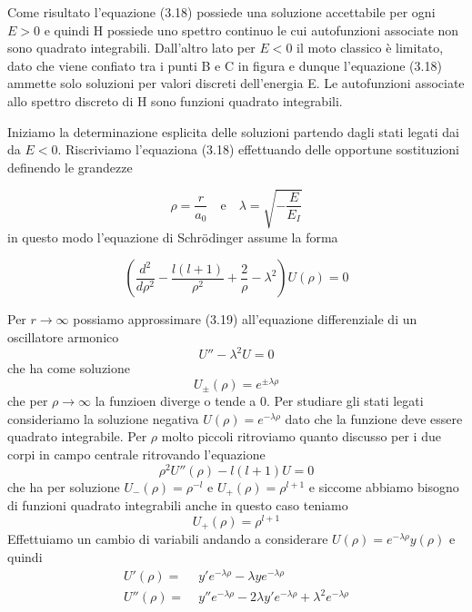 Come risultato l'equazione (3.18) possiede una soluzione accettabile per ogni $E > 0 $ e quindi H possiede uno spettro continuo le cui autofunzioni associate non sono quadrato integrabili. Dall'altro lato per $E < 0 $ il moto classico \`e limitato, dato che viene confiato tra i punti B e C in figura e dunque l'equazione (3.18) ammette solo soluzioni per valori discreti dell'energia E. Le autofunzioni associate allo spettro discreto di H sono funzioni quadrato integrabili.


Iniziamo la determinazione esplicita delle soluzioni partendo dagli stati legati dai da $E < 0$. Riscriviamo l'equaziona (3.18) effettuando delle opportune sostituzioni definendo le grandezze 

\begin{equation*}
	\rho = \frac{r}{a_0} \quad \text{e} \quad \lambda = \sqrt{-\frac{E}{E_I}}
\end{equation*}
in questo modo l'equazione di Schr\"odinger assume la forma 

\begin{equation}
	\left ( \frac{d^2}{d\rho^2} - \frac{l(l+1)}{\rho^2}+\frac{2}{\rho} - \lambda^2 \right )U(\rho) = 0 
\end{equation}

Per $r \to \infty$ possiamo approssimare (3.19) all'equazione differenziale di un oscillatore armonico
\begin{equation*}
	U''-\lambda^2U = 0
\end{equation*} 
che ha come soluzione 
\begin{equation*}
	U_{\pm}(\rho) = e ^{\pm \lambda \rho}
\end{equation*}
che per $\rho \to \infty$ la funzioen diverge o tende a 0. Per studiare gli stati legati consideriamo la soluzione negativa $U(\rho) = e^{-\lambda\rho}$ dato che la funzione deve essere quadrato integrabile. Per $\rho$ molto piccoli ritroviamo quanto discusso per i due corpi in campo centrale ritrovando l'equazione
\begin{equation*}
	\rho^2U''(\rho) - l(l+1)U = 0 
\end{equation*}
che ha per soluzione $U_{-}(\rho) = \rho^{-l}$ e $U_{+}(\rho) = \rho^{l+1}$ e siccome abbiamo bisogno di funzioni quadrato integrabili anche in questo caso teniamo
\begin{equation*}
	U_{+}(\rho) = \rho^{l+1}
\end{equation*}
Effettuiamo un cambio di variabili andando a considerare $U(\rho) = e^{-\lambda \rho}y(\rho)$ e quindi
\begin{align*}
	U'(\rho) = & \;y'e^{-\lambda \rho} - \lambda y e^{-\lambda \rho} \\[0.3cm]
	U''(\rho) = & \; y''e^{-\lambda \rho} - 2 \lambda y'e^{-\lambda \rho} + \lambda^2e^{-\lambda \rho}
\end{align*}

